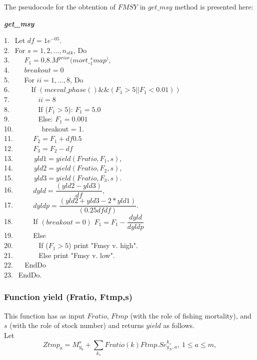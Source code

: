 \documentclass{article}
\begin{document}
The pseudocode for the obtention of $FMSY$ in $get\_msy$ method is presented here:
\begin{algorithm}
	\caption{{\bf \textit{get\_msy}}}
	1.  $\  \ $Let $df=1e^{-05}$. \\
	2.  $\  \ $For $s=1,2,...,n_{stk}$, Do\\
    3.  $\  \ \quad$ $F_1=0.8. M^{prior}(mort\_^s_1map^)$,\\
    4.  $\  \ \quad$  $breakout=0$\\
    5.  $\  \ \quad$ For $ii=1,...,8$, Do \\
	6.  $\  \ \qquad$ If $(mceval\_phase()\&\&(F_1>5||F_1< 0.01)) $\\
	7.  $\  \ \qquad$$\quad$ $ii=8$\\
	8.  $\  \ \qquad$$\quad$  If ($F_1>5$): $F_1=5.0$\\
	9.  $\  \ \qquad$$\quad$   Else: $F_1=0.001$\\
	10.  $\  \ \qquad$$\quad$   breakout = 1. \\
	11.  $\ \qquad$   $F_2 = F_1+df 0.5$\\
	12. $\ \qquad$  $F_3 = F_2 - df$\\
	13. $\quad$ $\quad$  $yld1 = yield(Fratio, F_1,s),$\\
    14. $\quad$ $\quad$  $yld2=yield(Fratio,F_2,s),$\\
    15. $\quad$ $\quad$  $yld3=yield(Fratio,F_3,s).$\\
    16. $\ \quad$$\quad$   $dyld=\dfrac{(yld2-yld3)}{df},$\\
    17. $\ \quad$$\quad$   $dyldp=\dfrac{(yld2+yld3-2*yld1)}{(0.25 df df)}$.\\
    18. $\ \quad$$\quad$   If $(breakout=0)$ $F_1=F_{1}-\dfrac{dyld}{dyldp}$\\
    19. $\ \quad$$\quad$   Else \\
    20. $\qquad$$\quad$   If ($F_1>5$) print "Fmsy v. high". \\
    21. $\qquad$$\quad$   Else print "Fmsy v. low". \\
    22. $\quad$ EndDo\\
    23. $\  \ $EndDo.
    
\end{algorithm}

\subsubsection{Function yield (Fratio, Ftmp,s)} \label{yield}
This function has as input $Fratio$, $Ftmp$ (with the role of fishing mortality), and $s$ (with the role of stock number) and returns $yield$ as follows.\\
Let
\begin{equation}
    Ztmp_a=M^s_{y_0}+\sum_{k_s}Fratio(k) Ftmp.Se^{k_s}_{y_N,a}, \ 1\leq a \leq m, 
\end{equation}
\end{document}
